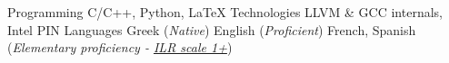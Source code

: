

\begin{cvskills}

  \cvskill
    {Programming}
        {C/C++, Python, \LaTeX}
  \cvskill
    {Technologies} %
		{LLVM \& GCC internals, Intel PIN} %
  \cvskill
    {Languages} %
    {Greek (\textit{Native}) \hspace*{7pt} English (\textit{Proficient}) \hspace*{7pt}  French, Spanish (\textit{Elementary proficiency - \href{http://www.govtilr.org/skills/ILRscale1.htm}{ILR scale 1+}})}

\end{cvskills}
